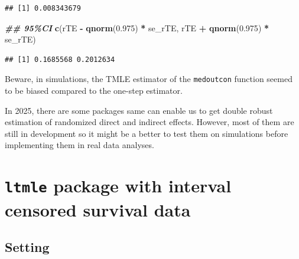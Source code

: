 \documentclass[
]{book}
\newenvironment{Shaded}{\begin{snugshade}}{\end{snugshade}}
\newcommand{\DocumentationTok}[1]{\textcolor[rgb]{0.56,0.35,0.01}{\textbf{\textit{#1}}}}
\newcommand{\FloatTok}[1]{\textcolor[rgb]{0.00,0.00,0.81}{#1}}
\newcommand{\FunctionTok}[1]{\textcolor[rgb]{0.13,0.29,0.53}{\textbf{#1}}}
\newcommand{\NormalTok}[1]{#1}
\newcommand{\OtherTok}[1]{\textcolor[rgb]{0.56,0.35,0.01}{#1}}
\newcommand{\SpecialCharTok}[1]{\textcolor[rgb]{0.81,0.36,0.00}{\textbf{#1}}}
\begin{document}
\begin{Shaded}
\end{Shaded}

\begin{verbatim}
## [1] 0.008343679
\end{verbatim}

\begin{Shaded}
\begin{Highlighting}[]
\DocumentationTok{\#\# 95\%CI}
\FunctionTok{c}\NormalTok{(rTE }\SpecialCharTok{{-}} \FunctionTok{qnorm}\NormalTok{(}\FloatTok{0.975}\NormalTok{) }\SpecialCharTok{*}\NormalTok{ se\_rTE,}
\NormalTok{  rTE }\SpecialCharTok{+} \FunctionTok{qnorm}\NormalTok{(}\FloatTok{0.975}\NormalTok{) }\SpecialCharTok{*}\NormalTok{ se\_rTE)}
\end{Highlighting}
\end{Shaded}

\begin{verbatim}
## [1] 0.1685568 0.2012634
\end{verbatim}

Beware, in simulations, the TMLE estimator of the \texttt{medoutcon} function seemed to be biased compared to the one-step estimator.

In 2025, there are some packages same can enable us to get double robust estimation of randomized direct and indirect effects. However, most of them are still in development so it might be a better to test them on simulations before implementing them in real data analyses.

\chapter{\texorpdfstring{\texttt{ltmle} package with interval censored survival data}{ltmle package with interval censored survival data}}\label{ltmle-package-with-interval-censored-survival-data}

\section{Setting}\label{setting}
\end{document}

